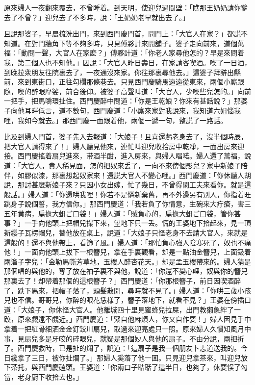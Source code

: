 原來婦人一夜翻來覆去，不曾睡着。到天明，使迎兒過間壁：「瞧那王奶奶請你爹去了不曾？」迎兒去了不多時，說：「王奶奶老早就出去了。」

且說那婆子，早晨梳洗出門，來到西門慶門首，問門上：「大官人在家？」都説不知道。在對門牆角下等不夠多時，只見傅夥計來開舖子。婆子走向前來，道個萬福：「動問一聲，大官人在家麽？」傅夥計道：「你老人家尋他怎的？早是來問着我，第二個人也不知他。」因說：「大官人昨日壽日，在家請客喫酒。喫了一日酒，到晚拉衆朋友往院裏去了，一夜通沒來家。你往那裏尋他去。」這婆子拜辭出縣前，來到東街口，正往勾欄那條巷去。只見西門慶騎馬遠遠從東來，兩個小廝跟隨，喫的醉眼摩娑，前合後仰。被婆子高聲叫道：「大官人，少喫些兒怎的。」向前一把手，把馬嚼環扯住。西門慶醉中問道：「你是王乾娘？你來有甚話說？」那婆子向他耳畔低言，道不數句，西門慶道：「小廝來家對我說來，我知道六姐惱我哩，我如今就去。」那西門慶一面跟着他，兩個一遞一句，整説了一路話。

比及到婦人門首，婆子先入去報道：「大娘子！且喜還虧老身去了，沒半個時辰，把大官人請得來了！」婦人聽見他來，連忙叫迎兒收拾房中乾凈，一面出房來迎接。西門慶搖着扇兒進來，带酒半酣，進入房來，與婦人唱喏。婦人還了萬福，說道：「大官人，貴人稀見面，怎的把奴來丢了，一向不來傍個影兒？家中新娘子陪伴，如膠似漆，那裏想起奴家來！還説大官人不變心哩。」西門慶道：「你休聽人胡說，那討甚麽新娘子來？只因小女出嫁，忙了幾日，不曾得閑工夫來看你。就是這般話。」婦人道：「你還哄我哩！你若不是憐新棄舊，再不外邊另有别人，你指着旺跳身子說個誓，我方信你。」那西門慶道：「我若負了你情意，生碗來大疔瘡，害三五年黄病，扁擔大蛆ご口袋！」婦人道：「賊負心的，扁擔大蛆ご口袋，管你甚事？」一手向他頭上把帽兒撮下來，望地下只一丢。慌的王婆地下拾起來，見一頂新纓子瓦楞帽兒，替他放在桌上，說道：「大娘子只怪老身不去請大官人，來就是這般的！還不與他帶上，看篩了風。」婦人道：「那怕負心強人陰寒死了，奴也不痛他！」一面向他頭上拔下一根簪兒，拿在手裏觀看，却是一點油金簪兒，上面鈒着兩溜子字兒：「金勒馬嘶芳草地，玉樓人醉杏花天。」却是孟玉樓帶來的。婦人猜是那個唱的與他的，奪了放在袖子裏不與他，說道：「你還不變心哩，奴與你的簪兒那裏去了！却帶着那個的這根簪子？」西門慶道：「你那根簪子，前日因喫酒醉了，跌下馬來，把帽子落了，頭髮散開，尋時就不見了。」婦人道：「你哄三歲小孩兒也不信。哥哥兒，你醉的眼花恁様了，簪子落地下，就看不見？」王婆在傍插口道：「大娘子，你休怪大官人。他離城四十里見蜜蜂兒拉屎，出門教獺象絆了一跤，原來覷遠不覷近。」西門慶道：「緊自他麻煩人，你又自作耍！」婦人因見手中拿着一把紅骨細洒金金釘鉸川扇兒，取過來迎亮處只一照。原來婦人久慣知風月中事，見扇兒多是牙咬的碎眼兒，就疑是那個妙人與他的扇子。不由分說，兩把折了。西門慶救時，已是扯的爛了，說道：「這扇子是我一個朋友卜志道送我的。今日纔拿了三日，被你扯爛了。」那婦人奚落了他一囬。只見迎兒拿茶來，叫迎兒放下茶托，與西門慶磕頭。王婆道：「你兩口子聐聒了這半日，也夠了，休要悮了勾當，老身廚下收拾去也。」

